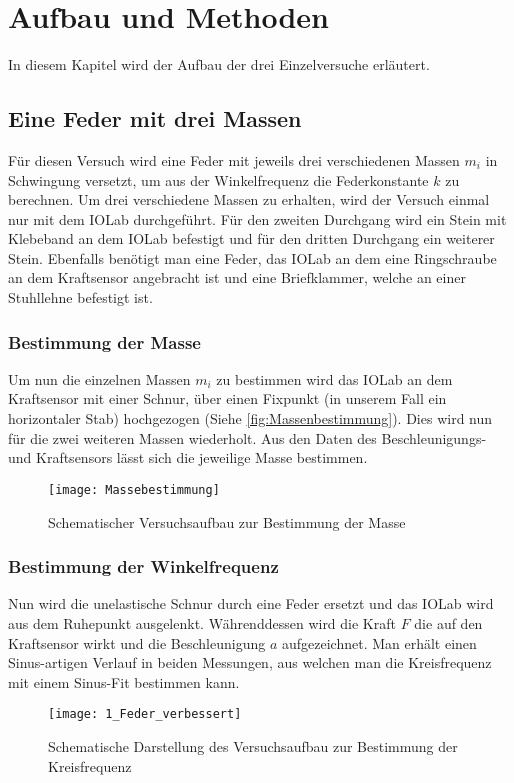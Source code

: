 
\section{Aufbau und Methoden}
\label{sec:aufbau}
In diesem Kapitel wird der Aufbau der drei Einzelversuche erläutert.
\subsection{Eine Feder mit drei Massen}
Für diesen Versuch wird eine Feder mit jeweils drei verschiedenen Massen $m_i$ in Schwingung versetzt, um aus der Winkelfrequenz die Federkonstante $k$ zu berechnen. Um drei verschiedene Massen zu erhalten, wird der Versuch einmal nur mit dem IOLab durchgeführt. Für den zweiten Durchgang wird ein Stein mit Klebeband an dem IOLab befestigt und für den dritten Durchgang ein weiterer Stein. Ebenfalls benötigt man eine Feder, das IOLab an dem eine Ringschraube an dem Kraftsensor angebracht ist und eine Briefklammer, welche an einer Stuhllehne befestigt ist.
\subsubsection{Bestimmung der Masse}
Um nun die einzelnen Massen $m_i$ zu bestimmen wird das IOLab an dem Kraftsensor mit einer Schnur, über einen Fixpunkt (in unserem Fall ein horizontaler Stab) hochgezogen (Siehe \autoref{fig:Massenbestimmung}). Dies wird nun für die zwei weiteren Massen wiederholt. Aus den Daten des Beschleunigungs- und Kraftsensors lässt sich die jeweilige Masse bestimmen. 
\begin{figure}[H]
	\centering
	\texttt{[image: Massebestimmung]}
	\caption[Versuchsaufbau der Massebestimmung]{Schematischer Versuchsaufbau zur Bestimmung der Masse}
	\label{fig:Massenbestimmung}
\end{figure}
\subsubsection{Bestimmung der Winkelfrequenz}
Nun wird die unelastische Schnur durch eine Feder ersetzt und das IOLab wird aus dem Ruhepunkt ausgelenkt. Währenddessen wird die Kraft $F$ die auf den Kraftsensor wirkt und die Beschleunigung $a$ aufgezeichnet. Man erhält einen Sinus-artigen Verlauf in beiden Messungen, aus welchen man die Kreisfrequenz mit einem Sinus-Fit bestimmen kann.
\begin{figure}[H]
	\centering
	\texttt{[image: 1\_Feder\_verbessert]}
	\caption[Versuchsaufbau für eine Feder]{Schematische Darstellung des Versuchsaufbau zur Bestimmung der Kreisfrequenz}
	\label{fig:Schwingungsperiode1}
\end{figure}
